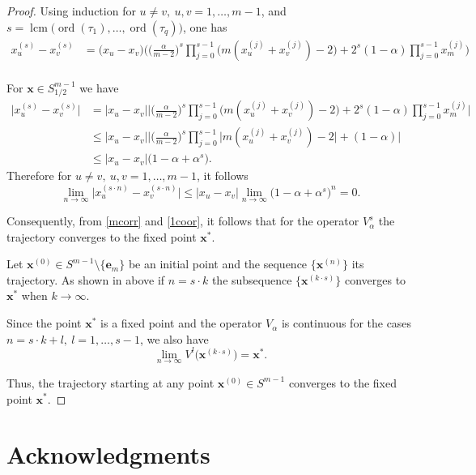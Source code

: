 \documentclass[11pt,reqno]{amsart}
\numberwithin{equation}{section} \setcounter{tocdepth}{1}
\DeclareMathOperator{\lcm}{lcm}
\DeclareMathOperator{\ord}{ord}
\begin{document}
\begin{proof}
Using induction for $u\neq v,  \ u,v=1,\dots,m-1$, and $s=\lcm \big(\ord (\tau_1),\dots, \ord (\tau_q)\big)$, one has
\begin{align*}
x_u^{(s)}-x_v^{(s)}&= \big(x_u-x_v\big)\Big(\Big(\frac{\alpha}{ m-2}\Big)^s\prod\limits_{j=0}^{s-1} \big(m(x_u^{(j)}+x_v^{(j)}) - 2\big)
    + 2^s(1-\alpha)\prod\limits_{j=0}^{s-1}x_m^{(j)} \Big) \\
\end{align*}


For $\mathbf{x}\in S^{m-1}_{1/2}$ we have
\begin{align*}
\big|x_u^{(s)}-x_v^{(s)}\big|&=\big|x_u-x_v\big|\bigg| \Big(\frac{\alpha}{m-2}\Big)^s\prod\limits_{j=0}^{s-1} \big(m(x_u^{(j)}+x_v^{(j)}) - 2\big)
    + 2^s(1-\alpha)\prod\limits_{j=0}^{s-1}x_m^{(j)}\bigg|\\
    &\leq \big|x_u-x_v\big| \bigg| \Big(\frac{\alpha}{m-2}\Big)^s\prod\limits_{j=0}^{s-1} \big|m(x_u^{(j)}+x_v^{(j)}) - 2\big|+
     (1-\alpha)\bigg|\\
    &\leq  \big|x_u-x_v\big| \big(1-\alpha+\alpha^s\big).
\end{align*}
Therefore for $u\neq v, \  u,v=1,\dots,m-1$, it follows
\begin{equation}\label{1coor}
\lim\limits_{n\rightarrow\infty} \big|x_u^{(s\cdot n)}-x_v^{(s\cdot n)}\big|\leq \big|x_u-x_v\big| \lim\limits_{n\rightarrow\infty} \big(1-\alpha+\alpha^s\big)^n=0.
\end{equation}

Consequently, from \eqref{mcorr} and \eqref{1coor}, it follows that for the operator $V_\alpha^s$ the trajectory  converges to
the fixed point $\mathbf{x}^*$.

Let $\mathbf{x}^{(0)}\in S^{m-1}\setminus \{\mathbf{e}_m\}$ be an initial point and the sequence  $\big\{\mathbf{x}^{(n)}\big\}$ its trajectory.
As shown in above if $n=s\cdot k$ the subsequence  $\{\mathbf{x}^{(k\cdot s)}\}$ converges to $\mathbf{x}^*$  when $k\rightarrow\infty$.

Since the point $\mathbf{x}^*$ is a fixed point and the operator $V_\alpha$ is continuous
for the cases $n=s\cdot k+l, \  l=1,\dots,s-1$, we also have
\[\lim\limits_{n\rightarrow\infty} V^l\big(\mathbf{x}^{(k\cdot s)}\big) = \mathbf{x}^*.\]

Thus, the trajectory starting at any point $\mathbf{x}^{(0)}\in S^{m-1}$ converges to
the fixed point $\mathbf{x}^*$.
\end{proof}


\section*{Acknowledgments}
\end{document}

